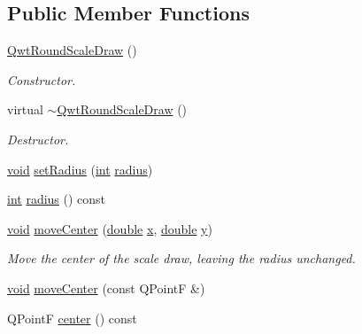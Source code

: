 \subsection*{Public Member Functions}
\begin{DoxyCompactItemize}
\item 
\hyperlink{class_qwt_round_scale_draw_a9c44d19488567825d826528b701587c8}{Qwt\-Round\-Scale\-Draw} ()
\begin{DoxyCompactList}\small\item\em Constructor. \end{DoxyCompactList}\item 
virtual \hyperlink{class_qwt_round_scale_draw_a81583432e629cd8a14524b05fabb4731}{$\sim$\-Qwt\-Round\-Scale\-Draw} ()
\begin{DoxyCompactList}\small\item\em Destructor. \end{DoxyCompactList}\item 
\hyperlink{group___u_a_v_objects_plugin_ga444cf2ff3f0ecbe028adce838d373f5c}{void} \hyperlink{class_qwt_round_scale_draw_a069d658989db2ad96f26b79a298f7d10}{set\-Radius} (\hyperlink{ioapi_8h_a787fa3cf048117ba7123753c1e74fcd6}{int} \hyperlink{class_qwt_round_scale_draw_a2eb03d12749a44f7ca8a8ff92514dd56}{radius})
\item 
\hyperlink{ioapi_8h_a787fa3cf048117ba7123753c1e74fcd6}{int} \hyperlink{class_qwt_round_scale_draw_a2eb03d12749a44f7ca8a8ff92514dd56}{radius} () const 
\item 
\hyperlink{group___u_a_v_objects_plugin_ga444cf2ff3f0ecbe028adce838d373f5c}{void} \hyperlink{class_qwt_round_scale_draw_af7e08b85826c5e1e5b1762fa07830107}{move\-Center} (\hyperlink{_super_l_u_support_8h_a8956b2b9f49bf918deed98379d159ca7}{double} \hyperlink{glext_8h_a1db9d104e3c2128177f26aff7b46982f}{x}, \hyperlink{_super_l_u_support_8h_a8956b2b9f49bf918deed98379d159ca7}{double} \hyperlink{glext_8h_a42315f3ed8fff752bb47fd782309fcfc}{y})
\begin{DoxyCompactList}\small\item\em Move the center of the scale draw, leaving the radius unchanged. \end{DoxyCompactList}\item 
\hyperlink{group___u_a_v_objects_plugin_ga444cf2ff3f0ecbe028adce838d373f5c}{void} \hyperlink{class_qwt_round_scale_draw_a7be4951c2998474a79e4f1d621ea412a}{move\-Center} (const Q\-Point\-F \&)
\item 
Q\-Point\-F \hyperlink{class_qwt_round_scale_draw_ae3d163159f0771bc05958faf798a1500}{center} () const 

\end{DoxyCompactItemize}
